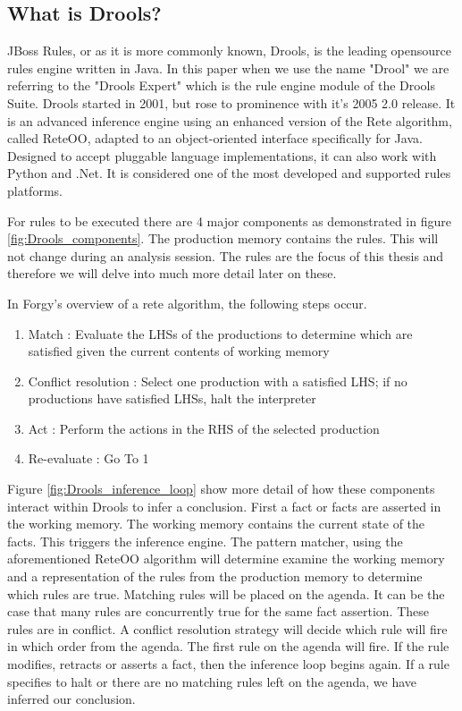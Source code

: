 \subsection{What is Drools?}\label{section:WhatIsDrools}

JBoss Rules, or as it is more commonly known, Drools, is the leading opensource rules engine written in Java.
In this paper when we use the name "Drool" we are referring to the "Drools Expert" which is the rule engine module of the Drools Suite.
Drools started in 2001, but rose to prominence with it's 2005 2.0 release.
It is an advanced inference engine using an enhanced version of the Rete algorithm, called Rete\-OO\cite{sottara2010configurable}, adapted to an object-oriented interface specifically for Java.
Designed to accept pluggable language implementations, it can also work with Python and .Net.
It is considered one of the most developed and supported rules platforms.

For rules to be executed there are 4 major components as demonstrated in figure \ref{fig:Drools_components}.
The production memory contains the rules.
This will not change during an analysis session.
The rules are the focus of this thesis and therefore we will delve into much more detail later on these.

In Forgy's\cite{forgy1989rete} overview of a rete algorithm, the following steps occur.
\begin{enumerate}
    \item Match : Evaluate the LHSs of the productions to determine which are satisfied given the current contents of working memory
    \item Conflict resolution : Select one production with a satisfied LHS; if no productions have satisfied LHSs, halt the interpreter
    \item Act : Perform the actions in the RHS of the selected production
    \item Re-evaluate : Go To 1
\end{enumerate}

Figure \ref{fig:Drools_inference_loop} show more detail of how these components interact within Drools to infer a conclusion.
First a fact or facts are asserted in the working memory.
The working memory contains the current state of the facts.
This triggers the inference engine.
The pattern matcher, using the aforementioned Rete\-OO algorithm will determine examine the working memory and a representation of the rules from the production memory to determine which rules are true.
Matching rules will be placed on the agenda.
It can be the case that many rules are concurrently true for the same fact assertion.
These rules are in conflict.
A conflict resolution strategy will decide which rule will fire in which order from the agenda.
The first rule on the agenda will fire.
If the rule modifies, retracts or asserts a fact, then the inference loop begins again.
If a rule specifies to halt or there are no matching rules left on the agenda, we have inferred our conclusion.


